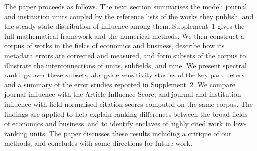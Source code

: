 The paper proceeds as follows. The next section summarises the model: journal and institution units coupled by the reference lists of the works they publish, and the steady-state distribution of influence among them. Supplement~1 gives the full mathematical framework and the numerical methods. We then construct a corpus of works in the fields of economics and business, describe how its metadata errors are corrected and measured, and form subsets of the corpus to illustrate the interconnections of units, subfields, and time. We present spectral rankings over these subsets, alongside sensitivity studies of the key parameters and a summary of the error studies reported in Supplement~2. We compare journal influence with the Article Influence Score, and journal and institution influence with field-normalised citation scores computed on the same corpus. The findings are applied to help explain ranking differences between the broad fields of economics and business, and to identify enclaves of highly cited work in low-ranking units. The paper discusses these results including a critique of our methods, and concludes with some directions for future work.

